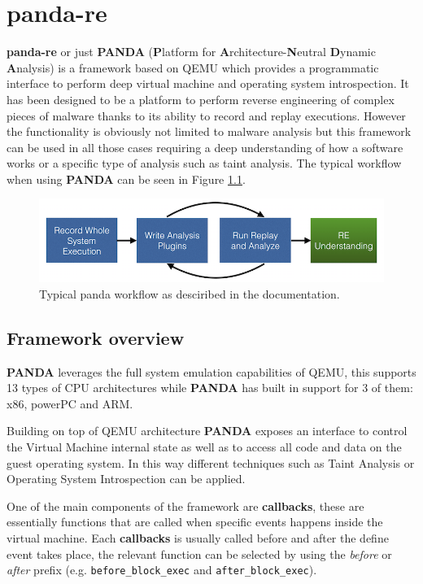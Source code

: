 \chapter{panda-re}
\label{chap:4}

\textbf{panda-re} or just \textbf{PANDA} (\textbf{P}latform  for  \textbf{A}rchitecture-\textbf{N}eutral  \textbf{D}ynamic  \textbf{A}nalysis) is a framework based on QEMU which provides a programmatic interface to perform deep virtual machine and operating system introspection. It has been designed to be a platform to perform reverse engineering of complex pieces of malware thanks to its ability to record and replay executions. However the functionality is obviously not limited to malware analysis but this framework can be used in all those cases requiring a deep understanding of how a software works or a specific type of analysis such as taint analysis. The typical workflow when using \textbf{PANDA} can be seen in Figure \ref{fig:wkflow}.

\begin{figure}[htp]
\centering
\includegraphics[width=\linewidth]{images/panda_workflow.png}
\caption{Typical panda workflow as desciribed in the documentation.}
\label{fig:wkflow}
\end{figure}


\section{Framework overview}

\textbf{PANDA} leverages the full system emulation capabilities of QEMU, this supports 13 types of CPU architectures while \textbf{PANDA} has built in support for 3 of them: x86, powerPC and ARM. 

Building on top of QEMU architecture \textbf{PANDA} exposes an interface to control the Virtual Machine internal state as well as to access all code and data on the guest operating system. In this way different techniques such as Taint Analysis or Operating System Introspection can be applied.

One of the main components of the framework are \textbf{callbacks}, these are essentially functions that are called when specific events happens inside the virtual machine. Each \textbf{callbacks} is usually called before and after the define event takes place, the relevant function can be selected by using the \textit{before} or \textit{after} prefix (e.g. \lstinline{before_block_exec} and \lstinline{after_block_exec}).

